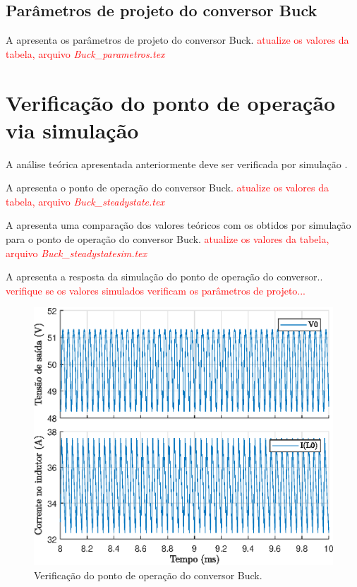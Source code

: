 \subsection{Parâmetros de projeto do conversor Buck}


A  apresenta os parâmetros de projeto do conversor Buck.
\textcolor{red}{atualize os valores da tabela, arquivo \emph{Buck\_parametros.tex} }





\section{Verificação do ponto de operação via simulação}

A análise teórica apresentada anteriormente deve ser verificada por simulação \cite{noauthor_psim_nodate}.

A  apresenta o ponto de operação do conversor Buck.
\textcolor{red}{atualize os valores da tabela, arquivo \emph{Buck\_steadystate.tex} }



A  apresenta uma comparação dos valores teóricos com os obtidos por simulação para o ponto de operação do conversor Buck.
\textcolor{red}{atualize os valores da tabela, arquivo \emph{Buck\_steadystatesim.tex} }



A  apresenta a resposta da simulação do ponto de operação do conversor..  \textcolor{red}{verifique se os valores simulados verificam os parâmetros de projeto...}

\begin{figure}[!ht]
	\centering
	\includegraphics[width=0.9\linewidth]{Figs/Buck}
	\caption{Verificação do ponto de operação do conversor Buck.}
	\label{fig:buck-steadystate}
\end{figure}




